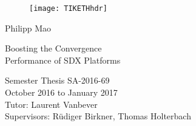   \begin{titlepage}

  \begin{center}
  \begin{figure}[!t]
     \texttt{[image: TIKETHhdr]}
  \end{figure}
  \end{center}

  \vspace{2 cm}

  {\large Philipp Mao}
  \vspace{2 cm}

  {\Huge Boosting the Convergence \\ Performance of SDX Platforms}\\

  \vspace{\fill}


  Semester Thesis SA-2016-69\\
  October 2016 to January 2017\\

  \vspace{1cm}
  Tutor: Laurent Vanbever \\
  Supervisors: R\"udiger Birkner, Thomas Holterbach \\
    
  \end{titlepage}

